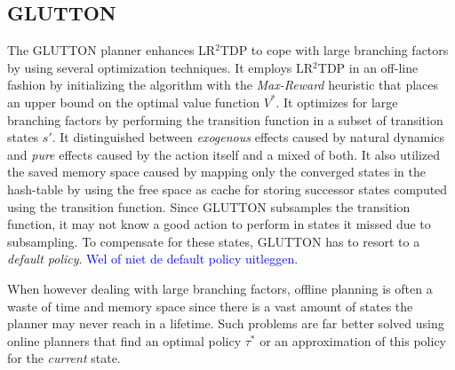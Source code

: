 \documentclass[runningheads,a4paper]{llncs}
\newcommand\todo[1]{\textcolor{blue}{#1}}
\begin{document}
\subsection{\textsc{GLUTTON}}
The \textsc{GLUTTON} planner enhances LR$^2$TDP to cope with large branching factors by using several optimization techniques. It employs LR$^2$TDP in an off-line fashion by initializing the algorithm with the \emph{Max-Reward} heuristic that places an upper bound on the optimal value function $V^*$. It optimizes for large branching factors by performing the transition function in a subset of transition states $s'$. It distinguished between \emph{exogenous} effects caused by natural dynamics and \emph{pure} effects caused by the action itself and a mixed of both. It also utilized the saved memory space caused by mapping only the converged states in the hash-table by using the free space as cache for storing successor states computed using the transition function. 
Since \textsc{GLUTTON} subsamples the transition function, it may not know a good action to perform in states it missed due to subsampling. To compensate for these states, \textsc{GLUTTON} has to resort to a \emph{default policy}. \todo{Wel of niet de default policy uitleggen}.
%

When however dealing with large branching factors, offline planning is often a waste of time and memory space since there is a vast amount of states the planner may never reach in a lifetime. Such problems are far better solved using online planners that find an optimal policy $\tau^*$ or an approximation of this policy for the \emph{current} state. 
\end{document}
